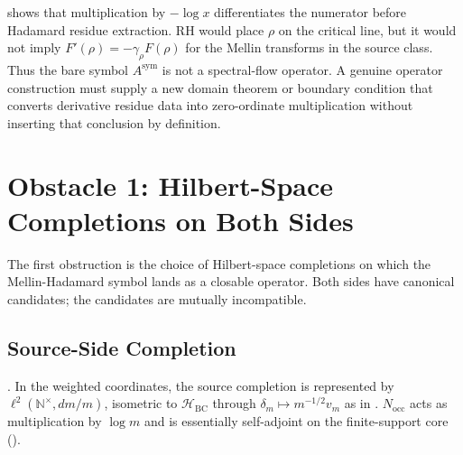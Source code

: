 \begin{remark}
\label{v4-arith:w9-r4:rem:formal-assumes-RH}
 shows that multiplication by $-\log x$
differentiates the numerator before Hadamard residue
extraction. RH would place \(\rho\) on the critical line, but it would
not imply \(F'(\rho)=-\gamma_{\rho}F(\rho)\) for the Mellin transforms
in the source class. Thus the bare symbol
\(A^{\mathrm{sym}}\) is not a spectral-flow operator. A genuine
operator construction must supply a new domain theorem or boundary
condition that converts derivative residue data into zero-ordinate
multiplication without inserting that conclusion by definition.
\end{remark}

\section{Obstacle 1: Hilbert-Space Completions on Both Sides}
\label{v4-arith:w9-r4:obstacle-hilbert}

The first obstruction is the choice of Hilbert-space completions on
which the Mellin-Hadamard symbol lands as a closable operator. Both
sides have canonical candidates; the candidates are mutually
incompatible.

\subsection{Source-Side Completion}
\label{v4-arith:w9-r4:obstacle-hilbert:source}

\begin{definition}
\label{v4-arith:w9-r4:def:source-completion}
\ClaimStatusDefinitional. In the weighted coordinates, the source completion is represented by
\(\ell^{2}(\mathbb{N}^{\times},dm/m)\), isometric to
\(\mathcal H_{\mathrm{BC}}\) through \(\delta_m\mapsto m^{-1/2}v_m\) as in
. \(N_{\mathrm{occ}}\) acts as
multiplication by \(\log m\) and is essentially self-adjoint on the
finite-support core
().
\end{definition}


